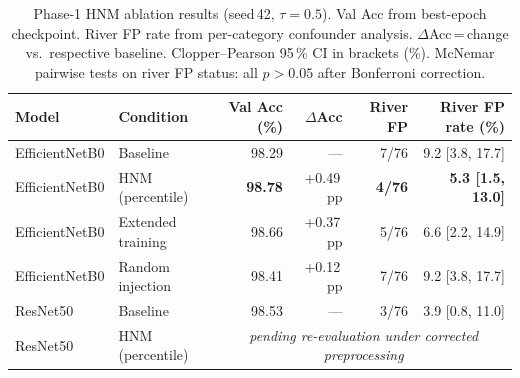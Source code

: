\documentclass[a4paper,fleqn]{cas-sc}
\newcommand{\EffNet}{EfficientNetB0\xspace}
\newcommand{\ResNet}{ResNet50\xspace}
\newcommand{\PHNM}{Phase-1 HNM\xspace}
\newcommand{\CP}{Clopper--Pearson\xspace}
\begin{document}
\begin{table}
  \centering
  \caption{\PHNM{} ablation results (seed\,42, $\tau{=}0.5$).
           Val Acc from best-epoch checkpoint.
           River FP rate from per-category confounder analysis.
           $\Delta$Acc\,=\,change vs.\ respective baseline.
           \CP{} 95\,\% CI in brackets (\%).
           McNemar pairwise tests on river FP status: all $p > 0.05$
           after Bonferroni correction.}
  \label{tab:hnm}
  \small
  \begin{tabular}{llrrrr}
    \toprule
    \textbf{Model} & \textbf{Condition} &
    \textbf{Val Acc (\%)} & \textbf{$\Delta$Acc} &
    \textbf{River FP} & \textbf{River FP rate (\%)} \\
    \midrule
    \EffNet{} & Baseline         & 98.29 & ---       & 7/76 & 9.2 [3.8, 17.7] \\
    \EffNet{} & HNM (percentile) & \textbf{98.78} & +0.49\,pp & \textbf{4/76} & \textbf{5.3 [1.5, 13.0]} \\
    \EffNet{} & Extended training & 98.66 & +0.37\,pp & 5/76 & 6.6 [2.2, 14.9] \\
    \EffNet{} & Random injection & 98.41 & +0.12\,pp & 7/76 & 9.2 [3.8, 17.7] \\
    \midrule
    \ResNet{} & Baseline         & 98.53 & ---       & 3/76 & 3.9 [0.8, 11.0] \\
    \ResNet{} & HNM (percentile) & \multicolumn{4}{c}{\textit{pending re-evaluation under corrected preprocessing}} \\
    \bottomrule
  \end{tabular}
\end{table}
\end{document}
